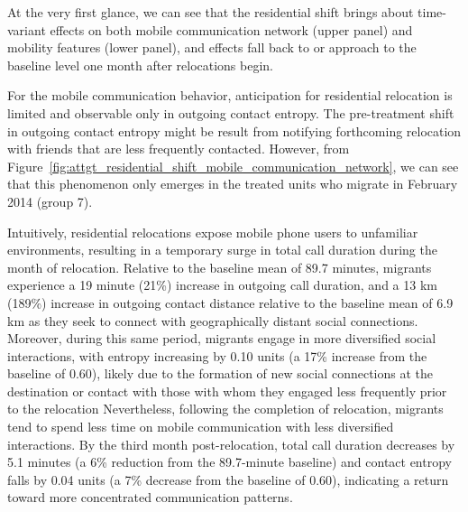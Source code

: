 At the very first glance, we can see that the residential shift brings about time-variant effects on both mobile communication network (upper panel) and mobility features (lower panel), and effects fall back to or approach to the baseline level one month after relocations begin.

For the mobile communication behavior, anticipation for residential relocation is limited and observable only in outgoing contact entropy.
The pre-treatment shift in outgoing contact entropy might be result from notifying forthcoming relocation with friends that are less frequently contacted.
However, from Figure~\ref{fig:attgt_residential_shift_mobile_communication_network}, we can see that this phenomenon only emerges in the treated units who migrate in February 2014 (group 7).

Intuitively, residential relocations expose mobile phone users to unfamiliar environments, resulting in a temporary surge in total call duration during the month of relocation.
Relative to the baseline mean of 89.7 minutes, migrants experience a 19 minute (21\%) increase in outgoing call duration, and a 13 km (189\%) increase in outgoing contact distance relative to the baseline mean of 6.9 km as they seek to connect with geographically distant social connections.
Moreover, during this same period, migrants engage in more diversified social interactions, with entropy increasing by 0.10 units (a 17\% increase from the baseline of 0.60), likely due to the formation of new social connections at the destination or contact with those with whom they engaged less frequently prior to the relocation
Nevertheless, following the completion of relocation, migrants tend to spend less time on mobile communication with less diversified interactions. By the third month post-relocation, total call duration decreases by 5.1 minutes (a 6\% reduction from the 89.7-minute baseline) and contact entropy falls by 0.04 units (a 7\% decrease from the baseline of 0.60), indicating a return toward more concentrated communication patterns.


